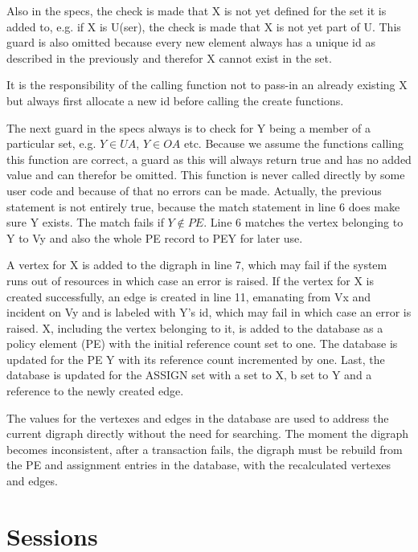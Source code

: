 \documentclass[12pt,a4paper,titlepage]{book}
\begin{document}
	Also in the specs, the check is made that X is not yet defined for the set it is added to, e.g. if X is U(ser), the check is made that X is not yet part of U. This guard is also omitted because every new element always has a unique id as described in the previously and therefor X cannot exist in the set.
	
	It is the responsibility of the calling function not to pass-in an already existing X but always first allocate a new id before calling the create functions.
	
	The next guard in the specs always is to check for Y being a member of a particular set, e.g. $ Y \in UA $, $ Y \in OA $ etc. Because we assume the functions calling this function are correct, a guard as this will always return true and has no added value and can therefor be omitted. This function is never called directly by some user code and because of that no errors can be made. Actually, the previous statement is not entirely true, because the match statement in line 6 does make sure Y exists. The match fails if $ Y \notin PE $. Line 6 matches the vertex belonging to Y to Vy and also the whole PE record to PEY for later use.
	
	A vertex for X is added to the digraph in line 7, which may fail if the system runs out of resources in which case an error is raised. If the vertex for X is created successfully, an edge is created in line 11, emanating from Vx and incident on Vy and is labeled with Y's id, which may fail in which case an error is raised. X, including the vertex belonging to it, is added to the database as a policy element (PE) with the initial reference count set to one. The database is updated for the PE Y with its reference count incremented by one. Last, the database is updated for the ASSIGN set with a set to X, b set to Y and a reference to the newly created edge.
	
	The values for the vertexes and edges in the database are used to address the current digraph directly without the need for searching. The moment the digraph becomes inconsistent, after a transaction fails, the digraph must be rebuild from the PE and assignment entries in the database, with the recalculated vertexes and edges.
	
	\section{Sessions}
	
	
	
\end{document}
